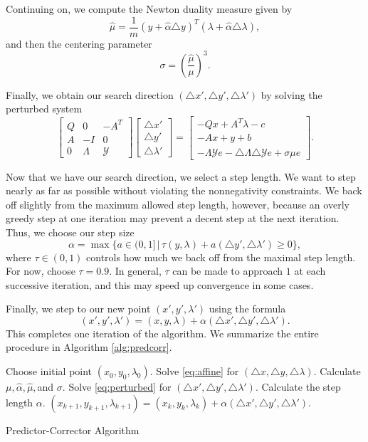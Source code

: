Continuing on, we compute the Newton duality measure given by
\[
\hat{\mu} = \frac{1}{m}(y + \hat{\alpha}\triangle y)^T(\lambda + \hat{\alpha}\triangle \lambda),
\]
and then the centering parameter
\[
\sigma = \left(\frac{\hat{\mu}}{\mu}\right)^3.
\]

Finally, we obtain our search direction $(\triangle x', \triangle y', \triangle \lambda')$ by solving the perturbed
system
\begin{equation}
\begin{bmatrix}
Q & 0 & -A^T\\
A & -I & 0\\
0 & \Lambda & \mathcal{Y}
\end{bmatrix}
\begin{bmatrix}
\triangle x'\\
\triangle y'\\
\triangle \lambda'
\end{bmatrix}
=
\begin{bmatrix}
-Qx + A^T\lambda - c\\
-Ax + y + b\\
-\Lambda\mathcal{Y}e - \triangle \Lambda\triangle\mathcal{Y}e + \sigma\mu e
\end{bmatrix}.
\label{eq:perturbed}
\end{equation}

Now that we have our search direction, we select a step length. We want to step nearly as far as possible
without violating the nonnegativity constraints. We back off slightly from the maximum allowed step length, however,
because an overly greedy step at one iteration may prevent a decent step at the next iteration. Thus,
we choose our step size
\[
\alpha = \max\{a \in (0,1] \, | \, \tau(y,\lambda) +a(\triangle y', \triangle \lambda') \geq 0\},
\]
where $\tau \in (0,1)$ controls how much we back off from the maximal step length. For now, choose $\tau = 0.9$.
In general, $\tau$ can be made to approach $1$ at each successive iteration, and this may speed up convergence in some cases.

Finally, we step to our new point $(x', y', \lambda')$ using the formula
\[
(x', y', \lambda') = (x, y, \lambda) + \alpha(\triangle x', \triangle y', \triangle \lambda').
\]
This completes one iteration of the algorithm.
We summarize the entire procedure in Algorithm \ref{alg:predcorr}.
\begin{algorithm}
\begin{algorithmic}[1]
    \State \textrm{Choose initial point } $(x_0, y_0, \lambda_0)$.
        \State \textrm{Solve \ref{eq:affine} for } $(\triangle x, \triangle y, \triangle \lambda)$.
        \State \textrm{Calculate } $\mu, \hat{\alpha}, \hat{\mu},$\textrm{and} $\sigma$.
        \State \textrm{Solve \ref{eq:perturbed} for } $(\triangle x', \triangle y',\triangle \lambda')$.
        \State \textrm{Calculate the step length } $\alpha$.
        \State $(x_{k+1}, y_{k+1}, \lambda_{k+1}) = (x_k, y_k, \lambda_k) + \alpha(\triangle x', \triangle y', \triangle \lambda').$
    \EndFor
\EndProcedure
\end{algorithmic}
\caption{Predictor-Corrector Algorithm}
\label{alg:predcorr}
\end{algorithm}

